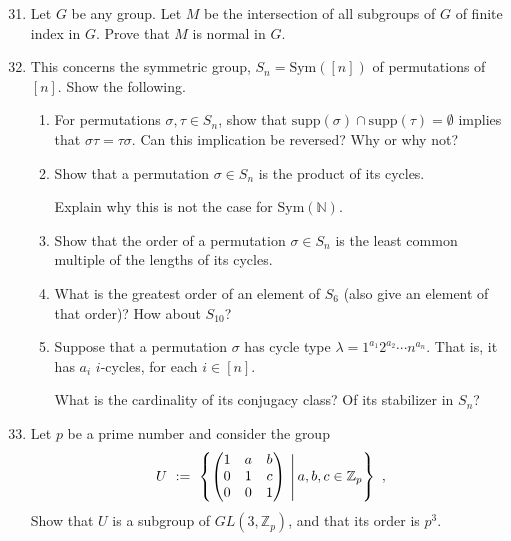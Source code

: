 \documentclass[12pt]{article}
\newcommand{\NN}{{\mathbb N}}
\newcommand{\ZZ}{{\mathbb Z}}
\newcommand{\Sym}{\mbox{Sym}}
\newcommand{\supp}{\mbox{supp}}
\begin{document}
\begin{enumerate}
\setcounter{enumi}{30}


%
\item
       Let $G$ be any group.
      Let $M$ be the intersection of all subgroups of $G$ of finite index in $G$.
      Prove that $M$ is normal in $G$.


\item
  This concerns the symmetric group, $S_n=\Sym([n])$ of permutations of $[n]$.   Show the following.
\begin{enumerate}
\item For permutations $\sigma,\tau\in S_n$, show that $\supp(\sigma)\cap\supp(\tau)=\emptyset$ implies that
  $\sigma\tau=\tau \sigma$.
  Can this implication be reversed?   Why or why not?
 
\item Show that a permutation $\sigma\in S_n$ is the product of its cycles.

      Explain why this is not the case for $\Sym(\NN)$.
 
\item Show that the order of a permutation $\sigma\in S_n$ is the least common multiple of the lengths of its cycles.
 
\item What is the greatest order of an element of $S_6$ (also give an element of that order)?
      How about $S_{10}$?
 
 
\item Suppose that a permutation $\sigma$ has cycle type $\lambda=1^{a_1} 2^{a_2}\dotsb n^{a_n}$.
  That is, it has $a_i$ $i$-cycles, for each $i\in[n]$.

  What is the cardinality of its conjugacy class?   Of its stabilizer in $S_n$?
  
\end{enumerate}


\item  Let $p$ be a prime number and consider the group 
\[
   U\ :=\ \left\{ \left(\begin{matrix}1&a&b\\0&1&c\\0&0&1\end{matrix}\right)\ 
    \rule[-15pt]{0.5pt}{34pt}\  a,b,c\in\ZZ_p \right\}\ ,
\] 
 Show that $U$ is a subgroup of $GL(3,\ZZ_p)$, and that its order is $p^3$.


\end{enumerate}
\end{document}
